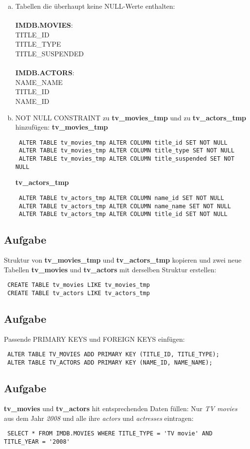 \documentclass[11pt,a4paper,DIV=9]{scrartcl}
\newcounter{temp}
\newcommand{\aufgabe}[1]{
  \setcounter{temp}{\value{subsection}}
  \setcounter{subsection}{#1}
  \addtocounter{subsection}{-1}
  \subsection{Aufgabe}
  \setcounter{subsection}{\value{temp}}
}
\begin{document}
 \begin{enumerate}[a.]
 \item
 Tabellen die \"uberhaupt keine NULL-Werte enthalten: \\\\
 \textbf{IMDB.MOVIES}: \\
 TITLE\_ID \\
 TITLE\_TYPE \\
 TITLE\_SUSPENDED \\\\
 \textbf{IMDB.ACTORS}: \\
 NAME\_NAME \\
 TITLE\_ID \\
 NAME\_ID \\
 \item
 NOT NULL CONSTRAINT zu \textbf{tv\_movies\_tmp} und zu \textbf{tv\_actors\_tmp} hinzuf\"ugen: 
 \textbf{tv\_movies\_tmp}
 \begin{lstlisting}
 ALTER TABLE tv_movies_tmp ALTER COLUMN title_id SET NOT NULL
 ALTER TABLE tv_movies_tmp ALTER COLUMN title_type SET NOT NULL
 ALTER TABLE tv_movies_tmp ALTER COLUMN title_suspended SET NOT NULL
 \end{lstlisting}
 \textbf{tv\_actors\_tmp}
 \begin{lstlisting}
 ALTER TABLE tv_actors_tmp ALTER COLUMN name_id SET NOT NULL
 ALTER TABLE tv_actors_tmp ALTER COLUMN name_name SET NOT NULL
 ALTER TABLE tv_actors_tmp ALTER COLUMN title_id SET NOT NULL
 \end{lstlisting} 
 \end{enumerate}
 \aufgabe{4}
 Struktur von \textbf{tv\_movies\_tmp} und \textbf{tv\_actors\_tmp} kopieren und zwei neue Tabellen \textbf{tv\_movies} und \textbf{tv\_actors} mit derselben Struktur erstellen: 
 \begin{lstlisting}
 CREATE TABLE tv_movies LIKE tv_movies_tmp
 CREATE TABLE tv_actors LIKE tv_actors_tmp
 \end{lstlisting}
 \aufgabe{5}
 Passende PRIMARY KEYS und FOREIGN KEYS einf\"ugen:
 \begin{lstlisting}
 ALTER TABLE TV_MOVIES ADD PRIMARY KEY (TITLE_ID, TITLE_TYPE);
 ALTER TABLE TV_ACTORS ADD PRIMARY KEY (NAME_ID, NAME_NAME); 
 \end{lstlisting}
 \aufgabe{6}
 \textbf{tv\_movies} und \textbf{tv\_actors} hit entsprechenden Daten f\"ullen:
 Nur \textit{TV movies} aus dem Jahr \textit{2008} und alle ihre \textit{actors} und \textit{actresses} eintragen:
 \begin{lstlisting}
 SELECT * FROM IMDB.MOVIES WHERE TITLE_TYPE = 'TV movie' AND TITLE_YEAR = '2008'
 \end{lstlisting}
\end{document}
